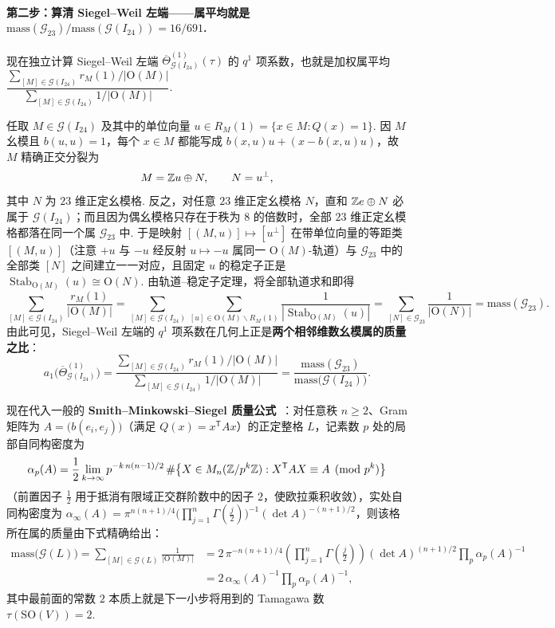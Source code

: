 \paragraph{第二步：算清 Siegel--Weil 左端——属平均就是 $\mathrm{mass}(\mathcal G_{23})/\mathrm{mass}(\mathcal G(I_{24}))=16/691$.}
现在独立计算 Siegel--Weil 左端 $\overline{\Theta}_{\mathcal G(I_{24})}^{(1)}(\tau)$ 的 $q^1$ 项系数，也就是加权属平均 $\dfrac{\sum_{[M]\in\mathcal G(I_{24})} r_M(1)/|\mathrm O(M)|}{\sum_{[M]\in\mathcal G(I_{24})} 1/|\mathrm O(M)|}$.

任取 $M\in\mathcal G(I_{24})$ 及其中的单位向量 $u\in R_M(1)=\{x\in M:Q(x)=1\}$. 因 $M$ 幺模且 $b(u,u)=1$，每个 $x\in M$ 都能写成 $b(x,u)u+(x-b(x,u)u)$，故 $M$ 精确正交分裂为
\[
M=\mathbb{Z} u\oplus N,\qquad N=u^\perp,
\]
其中 $N$ 为 $23$ 维正定幺模格. 反之，对任意 $23$ 维正定幺模格 $N$，直和 $\mathbb{Z} e\oplus N$ 必属于 $\mathcal G(I_{24})$；而且因为偶幺模格只存在于秩为 $8$ 的倍数时，全部 $23$ 维正定幺模格都落在同一个属 $\mathcal G_{23}$ 中. 于是映射 $[(M,u)]\mapsto [u^\perp]$ 在带单位向量的等距类 $[(M,u)]$（注意 $+u$ 与 $-u$ 经反射 $u\mapsto -u$ 属同一 $\mathrm O(M)$-轨道）与 $\mathcal G_{23}$ 中的全部类 $[N]$ 之间建立一一对应，且固定 $u$ 的稳定子正是 $\operatorname{Stab}_{\mathrm O(M)}(u)\cong\mathrm O(N)$. 由轨道--稳定子定理，将全部轨道求和即得
\[
\sum_{[M]\in\mathcal G(I_{24})}\frac{r_M(1)}{|\mathrm O(M)|}
=\sum_{[M]\in\mathcal G(I_{24})}\sum_{[u]\in\mathrm O(M)\backslash R_M(1)}\frac{1}{|\operatorname{Stab}_{\mathrm O(M)}(u)|}
=\sum_{[N]\in\mathcal G_{23}}\frac{1}{|\mathrm O(N)|}
=\mathrm{mass}(\mathcal G_{23}).
\]
由此可见，Siegel--Weil 左端的 $q^1$ 项系数在几何上正是\textbf{两个相邻维数幺模属的质量之比}：
\[
a_1\bigl(\overline{\Theta}_{\mathcal G(I_{24})}^{(1)}\bigr)
=\frac{\displaystyle\sum_{[M]\in\mathcal G(I_{24})} r_M(1)/|\mathrm O(M)|}
      {\displaystyle\sum_{[M]\in\mathcal G(I_{24})} 1/|\mathrm O(M)|}
=\frac{\mathrm{mass}(\mathcal G_{23})}{\mathrm{mass}\bigl(\mathcal G(I_{24})\bigr)}.
\]

现在代入一般的 \textbf{Smith--Minkowski--Siegel 质量公式}~\cite{Siegel1935,ConwaySloane1988,ConwaySloane1999}：对任意秩 $n\ge 2$、Gram 矩阵为 $A=\bigl(b(e_i,e_j)\bigr)$（满足 $Q(x)=x^{\mathsf T}Ax$）的正定整格 $L$，记素数 $p$ 处的局部自同构密度为
\[
\alpha_p(A)=\frac{1}{2}\lim_{k\to\infty}p^{-k\,n(n-1)/2}\,\#\bigl\{X\in M_n(\mathbb{Z}/p^k\mathbb{Z}):X^{\mathsf T}AX\equiv A\pmod{p^k}\bigr\}
\]
（前置因子 $\frac{1}{2}$ 用于抵消有限域正交群阶数中的因子 $2$，使欧拉乘积收敛），实处自同构密度为 $\alpha_\infty(A)=\pi^{n(n+1)/4}\bigl(\prod_{j=1}^{n}\Gamma(\tfrac{j}{2})\bigr)^{-1}(\det A)^{-(n+1)/2}$，则该格所在属的质量由下式精确给出：
\[
\begin{aligned}
\mathrm{mass}\bigl(\mathcal G(L)\bigr)
=\sum_{[M]\in\mathcal G(L)}\frac{1}{|\mathrm O(M)|}
&=2\,\pi^{-n(n+1)/4}\left(\prod_{j=1}^{n}\Gamma\!\left(\frac{j}{2}\right)\right)(\det A)^{(n+1)/2}\prod_{p}\alpha_p(A)^{-1}\\
&=2\,\alpha_\infty(A)^{-1}\prod_{p}\alpha_p(A)^{-1},
\end{aligned}
\]
其中最前面的常数 $2$ 本质上就是下一小步将用到的 Tamagawa 数 $\tau(\mathrm{SO}(V))=2$.

